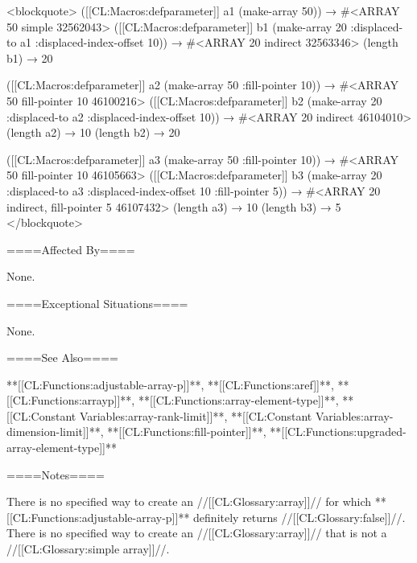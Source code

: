 <blockquote> ([[CL:Macros:defparameter]] a1 (make-array 50)) → #<ARRAY 50 simple 32562043> ([[CL:Macros:defparameter]] b1 (make-array 20 :displaced-to a1 :displaced-index-offset 10)) → #<ARRAY 20 indirect 32563346> (length b1) → 20

([[CL:Macros:defparameter]] a2 (make-array 50 :fill-pointer 10)) → #<ARRAY 50 fill-pointer 10 46100216> ([[CL:Macros:defparameter]] b2 (make-array 20 :displaced-to a2 :displaced-index-offset 10)) → #<ARRAY 20 indirect 46104010> (length a2) → 10 (length b2) → 20

([[CL:Macros:defparameter]] a3 (make-array 50 :fill-pointer 10)) → #<ARRAY 50 fill-pointer 10 46105663> ([[CL:Macros:defparameter]] b3 (make-array 20 :displaced-to a3 :displaced-index-offset 10 :fill-pointer 5)) → #<ARRAY 20 indirect, fill-pointer 5 46107432> (length a3) → 10 (length b3) → 5 </blockquote>


====Affected By====

None.

====Exceptional Situations====

None.

====See Also====

**[[CL:Functions:adjustable-array-p]]**, **[[CL:Functions:aref]]**, **[[CL:Functions:arrayp]]**, **[[CL:Functions:array-element-type]]**, **[[CL:Constant Variables:array-rank-limit]]**, **[[CL:Constant Variables:array-dimension-limit]]**, **[[CL:Functions:fill-pointer]]**, **[[CL:Functions:upgraded-array-element-type]]**

====Notes====

There is no specified way to create an //[[CL:Glossary:array]]// for which **[[CL:Functions:adjustable-array-p]]** definitely returns //[[CL:Glossary:false]]//. There is no specified way to create an //[[CL:Glossary:array]]// that is not a //[[CL:Glossary:simple array]]//.



   

